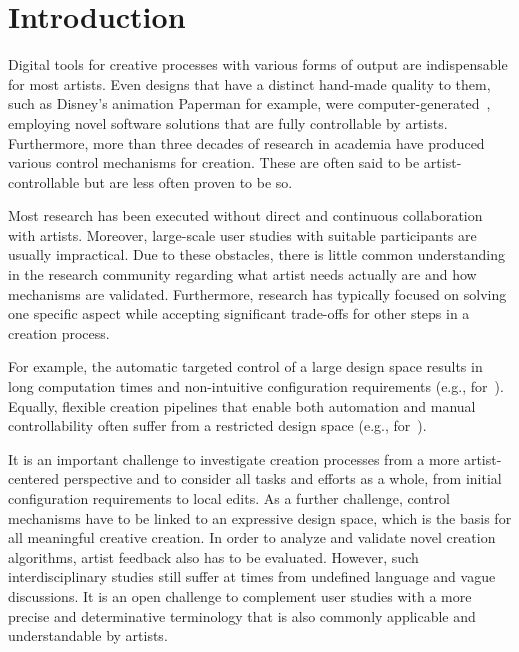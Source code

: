 

\section{Introduction}

Digital tools for creative processes with various forms of output are indispensable for most artists. Even designs that have a distinct hand-made quality to them, such as Disney's animation Paperman for example, were computer-generated~\cite{disney_2012_ppm}, employing novel software solutions that are fully controllable by artists. Furthermore, more than three decades of research in academia have produced various control mechanisms for creation. These are often said to be artist-controllable but are less often proven to be so.

Most research has been executed without direct and continuous collaboration with artists. Moreover, large-scale user studies with suitable participants are usually impractical. Due to these obstacles, there is little common understanding in the research community regarding what artist needs actually are and how mechanisms are validated. Furthermore, research has typically focused on solving one specific aspect while accepting significant trade-offs for other steps in a creation process.

For example, the automatic targeted control of a large design space results in long computation times and non-intuitive configuration requirements (e.g., for~\cite{bourque_2004_ptm, wong_1998_cgf}). Equally, flexible creation pipelines that enable both automation and manual controllability often suffer from a restricted design space (e.g., for~\cite{santoni_2016_ggp}).  

It is an important challenge to investigate creation processes from a more artist-centered perspective and to consider all tasks and efforts as a whole, from initial configuration requirements to local edits. As a further challenge, control mechanisms have to be linked to an expressive design space, which is the basis for all meaningful creative creation. In order to analyze and validate novel creation algorithms, artist feedback also has to be evaluated. However, such interdisciplinary studies still suffer at times from undefined language and vague discussions. It is an open challenge to complement user studies with a more precise and determinative terminology that is also commonly applicable and understandable by artists.

